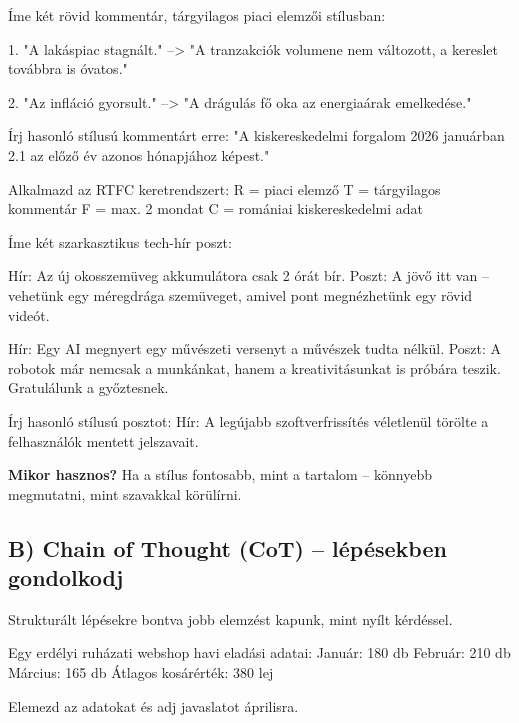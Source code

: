 \documentclass[11pt,a4paper]{article}
\newcommand{\tip}[1]{%
  \vspace{3pt}%
  \begin{tcolorbox}[tipstyle]%
  \textbf{\textcolor{tipborder}{Mikor hasznos?}} #1%
  \end{tcolorbox}\vspace{2pt}}
\newcommand{\lbl}[1]{\vspace{6pt}\noindent{\small\bfseries\textcolor{labelcolor}{#1}}\par\smallskip}
\begin{document}
\begin{prompt}
Íme két rövid kommentár, tárgyilagos piaci elemzői stílusban:

1. "A lakáspiac stagnált."
   --> "A tranzakciók volumene nem változott, a kereslet továbbra is óvatos."

2. "Az infláció gyorsult."
   --> "A drágulás fő oka az energiaárak emelkedése."

Írj hasonló stílusú kommentárt erre:
"A kiskereskedelmi forgalom 2026 januárban 2.1%
az előző év azonos hónapjához képest."

Alkalmazd az RTFC keretrendszert:
R = piaci elemző
T = tárgyilagos kommentár
F = max. 2 mondat
C = romániai kiskereskedelmi adat
\end{prompt}

\lbl{Alternatív feladat -- szarkasztikus tech poszt}

\begin{prompt}
Íme két szarkasztikus tech-hír poszt:

Hír: Az új okosszemüveg akkumulátora csak 2 órát bír.
Poszt: A jövő itt van -- vehetünk egy méregdrága szemüveget,
       amivel pont megnézhetünk egy rövid videót.

Hír: Egy AI megnyert egy művészeti versenyt a művészek tudta nélkül.
Poszt: A robotok már nemcsak a munkánkat, hanem a kreativitásunkat
       is próbára teszik. Gratulálunk a győztesnek.

Írj hasonló stílusú posztot:
Hír: A legújabb szoftverfrissítés véletlenül törölte a felhasználók
     mentett jelszavait.
\end{prompt}

\tip{Ha a stílus fontosabb, mint a tartalom -- könnyebb megmutatni, mint szavakkal körülírni.}

\subsection{B) Chain of Thought (CoT) -- lépésekben gondolkodj}

Strukturált lépésekre bontva jobb elemzést kapunk, mint nyílt kérdéssel.

\begin{prompt}
Egy erdélyi ruházati webshop havi eladási adatai:
Január: 180 db   Február: 210 db   Március: 165 db
Átlagos kosárérték: 380 lej

Elemezd az adatokat és adj javaslatot áprilisra.
\end{prompt}
\end{document}
